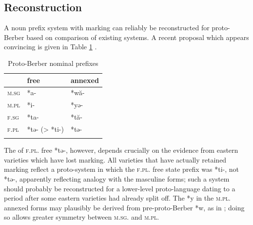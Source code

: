 \documentclass[output=paper,colorlinks,citecolor=brown]{langscibook}
\begin{document}
\subsection{Reconstruction} \label{13sec3.2}

A noun prefix system with  marking can reliably be reconstructed for proto-Berber based on comparison of existing systems. A recent proposal which appears convincing is given in Table \ref{13tab10} \citep{vanputten2015}.

\begin{table}[ht]
	\centering
	\begin{tabular}{lll}%
		\lsptoprule
			& free\is{state!free} & annexed\is{state!annexed} \\
			\midrule
			\textsc{m.sg} & *a- & *wă- \\
			\textsc{m.pl} & *i- & *yə- \\
			\textsc{f.sg} & *ta- & *tă- \\
			\textsc{f.pl} & *tə- (> *ti-) & *tə- \\
		\lspbottomrule
	\end{tabular}
	\caption{Proto-Berber nominal prefixes\is{nominal!prefix}}
	\label{13tab10}
\end{table}

The  of \textsc{f.pl.} free *tə-, however, depends crucially on the evidence from eastern  varieties which have lost  marking. All varieties that have actually retained  marking reflect a proto-system in which the \textsc{f.pl.} free state prefix was *ti-, not *tə-, apparently reflecting analogy with the masculine forms; such a system should probably be reconstructed for a lower-level proto-language dating to a period after some eastern  varieties had already split off. The *y in the \textsc{m.pl.} annexed forms may plausibly be derived from pre-proto-Berber *w, as in \citet[14--16]{prasse1974}; doing so allows greater symmetry between \textsc{m.sg.} and \textsc{m.pl.}
\end{document}

